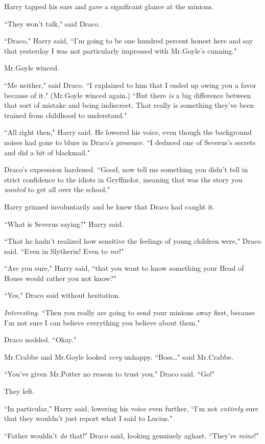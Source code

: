 Harry tapped his ears and gave a significant glance at the minions.

``They won't talk," said Draco.

``Draco," Harry said, ``I'm going to be one hundred percent honest here and say that yesterday I was not particularly impressed with Mr.\?Goyle's cunning."

Mr.\?Goyle winced.

``Me neither," said Draco. ``I explained to him that I ended up owing you a favor because of it." (Mr.\?Goyle winced again.) ``But there \emph{is} a big difference between that sort of mistake and being indiscreet. That really is something they've been trained from childhood to understand."

``All right then," Harry said. He lowered his voice, even though the background noises had gone to blurs in Draco's presence. ``I deduced one of Severus's secrets and did a bit of blackmail."

Draco's expression hardened. ``Good, now tell me something you didn't tell in strict confidence to the idiots in Gryffindor, meaning that was the story you \emph{wanted} to get all over the school."

Harry grinned involuntarily and he knew that Draco had caught it.

``What is Severus saying?" Harry said.

``That he hadn't realized how sensitive the feelings of young children were," Draco said. ``Even in Slytherin! Even to \emph{me}!"

``Are you sure," Harry said, ``that you want to know something your Head of House would rather you not know?"

``Yes," Draco said without hesitation.

\emph{Interesting.} ``Then you really are going to send your minions away first, because I'm not sure I can believe everything you believe about them."

Draco nodded. ``Okay."

Mr.\?Crabbe and Mr.\?Goyle looked \emph{very} unhappy. ``Boss{\ldots}" said Mr.\?Crabbe.

``You've given Mr.\?Potter no reason to trust you," Draco said. ``Go!"

They left.

``In particular," Harry said, lowering his voice even further, ``I'm not \emph{entirely} sure that they wouldn't just report what I said to Lucius."

``Father wouldn't \emph{do} that!" Draco said, looking genuinely aghast. ``They're \emph{mine}!"


